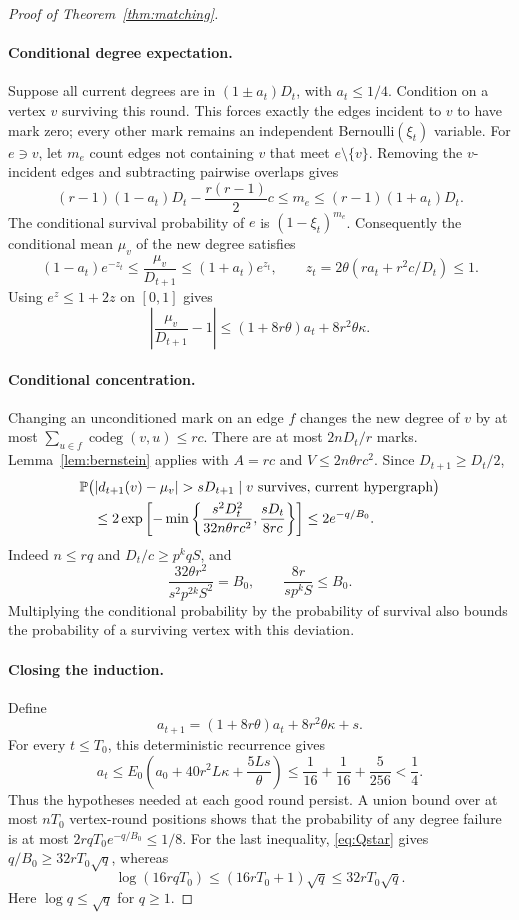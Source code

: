 \documentclass[11pt]{article}
\theoremstyle{remark}
\newcommand{\Prob}{\mathbb P}
\newcommand{\codeg}{\operatorname{codeg}}
\begin{document}
\begin{proof}[Proof of Theorem~\ref{thm:matching}]
\paragraph{Conditional degree expectation.}
Suppose all current degrees are in $(1\pm a_t)D_t$, with $a_t\le1/4$.
Condition on a vertex $v$ surviving this round. This forces exactly the
edges incident to $v$ to have mark zero; every other mark remains an
independent Bernoulli$(\xi_t)$ variable.
For $e\ni v$, let $m_e$ count edges not containing $v$ that meet
$e\setminus\{v\}$. Removing the $v$-incident edges and subtracting pairwise
overlaps gives
\[
 (r-1)(1-a_t)D_t-\frac{r(r-1)}2c
 \le m_e\le(r-1)(1+a_t)D_t.
\]
The conditional survival probability of $e$ is $(1-\xi_t)^{m_e}$.
Consequently the conditional mean $\mu_v$ of the new degree satisfies
\[
 (1-a_t)e^{-z_t}\le\frac{\mu_v}{D_{t+1}}
 \le(1+a_t)e^{z_t},\qquad
 z_t=2\theta(ra_t+r^2c/D_t)\le1.
\]
Using $e^z\le1+2z$ on $[0,1]$ gives
\begin{equation}\label{eq:mean-degree}
 \left|\frac{\mu_v}{D_{t+1}}-1\right|
 \le(1+8r\theta)a_t+8r^2\theta\kappa.
\end{equation}

\paragraph{Conditional concentration.}
Changing an unconditioned mark on an edge $f$ changes the new degree of
$v$ by at most $\sum_{u\in f}\codeg(v,u)\le rc$.
There are at most $2nD_t/r$ marks. Lemma~\ref{lem:bernstein} applies with
$A=rc$ and $V\le2n\theta rc^2$. Since $D_{t+1}\ge D_t/2$,
\begin{align}
 &\Prob\bigl(|d_{t+1}(v)-\mu_v|>sD_{t+1}
       \mid v\text{ survives},\,\text{current hypergraph}\bigr)\notag\\
 &\quad\le2\exp\left[-\min\left\{
  \frac{s^2D_t^2}{32n\theta rc^2},\frac{sD_t}{8rc}\right\}\right]
 \le2e^{-q/B_0}.                                      \label{eq:degree-tail}
\end{align}
Indeed $n\le rq$ and $D_t/c\ge p^kqS$, and
\[
 \frac{32\theta r^2}{s^2p^{2k}S^2}=B_0,
 \qquad \frac{8r}{sp^kS}\le B_0.
\]
Multiplying the conditional probability by the probability of survival
also bounds the probability of a surviving vertex with this deviation.

\paragraph{Closing the induction.}
Define
\[
 a_{t+1}=(1+8r\theta)a_t+8r^2\theta\kappa+s.
\]
For every $t\le T_0$, this deterministic recurrence gives
\[
 a_t\le E_0\left(a_0+40r^2L\kappa+\frac{5Ls}{\theta}\right)
 \le\frac1{16}+\frac1{16}+\frac5{256}<\frac14.
\]
Thus the hypotheses needed at each good round persist. A union bound over
at most $nT_0$ vertex-round positions shows that the probability of any
degree failure is at most $2rqT_0e^{-q/B_0}\le1/8$.
For the last inequality, \eqref{eq:Qstar} gives
$q/B_0\ge32rT_0\sqrt q$, whereas
\[
 \log(16rqT_0)\le(16rT_0+1)\sqrt q\le32rT_0\sqrt q.
\]
Here $\log q\le\sqrt q$ for $q\ge1$.


\end{proof}
\end{document}
